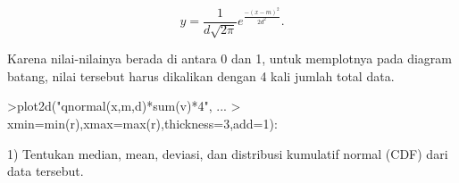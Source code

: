 \documentclass[12pt,arial,letterpaper]{book}
\begin{document}
\begin{eulercomment}
\begin{eulercomment}
\begin{eulercomment}
\begin{eulercomment}
\begin{eulercomment}
\begin{eulercomment}
\begin{eulercomment}
\begin{eulercomment}
\begin{eulercomment}
\begin{eulercomment}
\begin{eulercomment}
\begin{eulercomment}
\begin{eulercomment}
\begin{eulercomment}
\begin{eulercomment}
\begin{eulercomment}
\begin{eulercomment}
\begin{eulercomment}
\begin{eulercomment}
\begin{eulercomment}
\begin{eulercomment}
\begin{eulercomment}
\begin{eulercomment}
\begin{eulercomment}
\begin{eulercomment}
\begin{eulercomment}
\begin{eulercomment}
\begin{eulercomment}
\begin{eulercomment}
\begin{eulercomment}
\begin{eulercomment}
\begin{eulercomment}
\begin{eulercomment}
\end{eulercomment}
\begin{eulerformula}
\[
y=\frac{1}{d\sqrt{2\pi}}e^{\frac{-(x-m)^2}{2d^2}}.
\]
\end{eulerformula}
\begin{eulercomment}
Karena nilai-nilainya berada di antara 0 dan 1, untuk memplotnya pada
diagram batang, nilai tersebut harus dikalikan dengan 4 kali jumlah
total data.
\end{eulercomment}
\begin{eulerprompt}
>plot2d("qnormal(x,m,d)*sum(v)*4", ...
>  xmin=min(r),xmax=max(r),thickness=3,add=1):
\end{eulerprompt}
\begin{eulercomment}
1) Tentukan median, mean, deviasi, dan distribusi kumulatif normal
(CDF) dari data tersebut.


\end{eulercomment}
\end{eulercomment}
\end{eulercomment}
\end{eulercomment}
\end{eulercomment}
\end{eulercomment}
\end{eulercomment}
\end{eulercomment}
\end{eulercomment}
\end{eulercomment}
\end{eulercomment}
\end{eulercomment}
\end{eulercomment}
\end{eulercomment}
\end{eulercomment}
\end{eulercomment}
\end{eulercomment}
\end{eulercomment}
\end{eulercomment}
\end{eulercomment}
\end{eulercomment}
\end{eulercomment}
\end{eulercomment}
\end{eulercomment}
\end{eulercomment}
\end{eulercomment}
\end{eulercomment}
\end{eulercomment}
\end{eulercomment}
\end{eulercomment}
\end{eulercomment}
\end{eulercomment}
\end{eulercomment}
\end{document}
